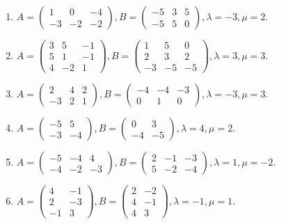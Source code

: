 \begin{enumerate}[label=\arabic*.,]
\item $A = \begin{pmatrix} 1 & 0 & -4 \\ -3 & -2 & -2 \end{pmatrix},  B = \begin{pmatrix} -5 & 3 & 5 \\ -5 & 5 & 0 \end{pmatrix},  \lambda = -3,  \mu = 2$.
\item $A = \begin{pmatrix} 3 & 5 & -1 \\ 5 & 1 & -1 \\ 4 & -2 & 1 \end{pmatrix},  B = \begin{pmatrix} 1 & 5 & 0 \\ 2 & 3 & 2 \\ -3 & -5 & -5 \end{pmatrix},  \lambda = 3,  \mu = 3$.
\item $A = \begin{pmatrix} 2 & 4 & 2 \\ -3 & 2 & 1 \end{pmatrix},  B = \begin{pmatrix} -4 & -4 & -3 \\ 0 & 1 & 0 \end{pmatrix},  \lambda = -3,  \mu = 3$.
\item $A = \begin{pmatrix} -5 & 5 \\ -3 & -4 \end{pmatrix},  B = \begin{pmatrix} 0 & 3 \\ -4 & -5 \end{pmatrix},  \lambda = 4,  \mu = 2$.
\item $A = \begin{pmatrix} -5 & -4 & 4 \\ -4 & -2 & -3 \end{pmatrix},  B = \begin{pmatrix} 2 & -1 & -3 \\ 5 & -2 & -4 \end{pmatrix},  \lambda = 1,  \mu = -2$.
\item $A = \begin{pmatrix} 4 & -1 \\ 2 & -3 \\ -1 & 3 \end{pmatrix},  B = \begin{pmatrix} 2 & -2 \\ 4 & -1 \\ 4 & 3 \end{pmatrix},  \lambda = -1,  \mu = 1$.
\end{enumerate}
